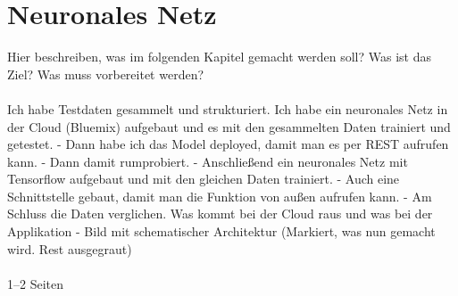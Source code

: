 \chapter{Neuronales Netz}
\label{ch:neuronalesNetz}

Hier beschreiben, was im folgenden Kapitel gemacht werden soll? Was ist das Ziel? Was muss vorbereitet werden?
\\ \\
Ich habe Testdaten gesammelt und strukturiert. Ich habe ein neuronales Netz in der Cloud (Bluemix) aufgebaut und es
mit den gesammelten Daten trainiert und getestet. - Dann habe ich das Model deployed, damit man es per REST aufrufen kann.
- Dann damit rumprobiert. - Anschließend ein neuronales Netz mit Tensorflow aufgebaut und mit den gleichen Daten trainiert.
- Auch eine Schnittstelle gebaut, damit man die Funktion von außen aufrufen kann. - Am Schluss die Daten verglichen. Was
kommt bei der Cloud raus und was bei der Applikation - Bild mit schematischer Architektur (Markiert, was nun gemacht wird.
Rest ausgegraut)
\\ \\
1--2 Seiten